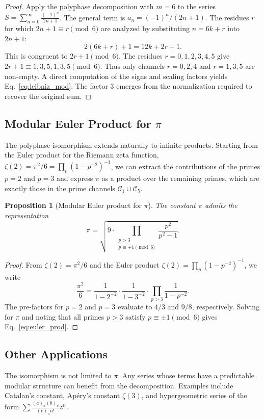 \documentclass{article}
\theoremstyle{plain}
\newtheorem{proposition}[theorem]{Proposition}
\theoremstyle{definition}
\theoremstyle{remark}
\begin{document}
\begin{proof}
Apply the polyphase decomposition with \(m=6\) to the series \(S = \sum_{n=0}^{\infty} \frac{(-1)^n}{2n+1}\). The general term is \(a_n = (-1)^n / (2n+1)\). The residues \(r\) for which \(2n+1 \equiv r \pmod{6}\) are analyzed by substituting \(n = 6k + r\) into \(2n+1\):
\[
2(6k+r)+1 = 12k + 2r + 1.
\]
This is congruent to \(2r+1 \pmod{6}\). The residues \(r=0,1,2,3,4,5\) give \(2r+1 \equiv 1,3,5,1,3,5 \pmod{6}\). Thus only channels \(r=0,2,4\) and \(r=1,3,5\) are non-empty. A direct computation of the signs and scaling factors yields Eq.~\eqref{eq:leibniz_mod}. The factor 3 emerges from the normalization required to recover the original sum.
\end{proof}

\subsection{Modular Euler Product for \texorpdfstring{\(\pi\)}{pi}}
The polyphase isomorphism extends naturally to infinite products. Starting from the Euler product for the Riemann zeta function, \(\zeta(2) = \pi^2/6 = \prod_p (1 - p^{-2})^{-1}\), we can extract the contributions of the primes \(p=2\) and \(p=3\) and express \(\pi\) as a product over the remaining primes, which are exactly those in the prime channels \(\mathcal{C}_1 \cup \mathcal{C}_5\).

\begin{proposition}[Modular Euler product for \(\pi\)]
\label{prop:euler}
The constant \(\pi\) admits the representation
\begin{equation}
\pi = \sqrt{9 \cdot \prod_{\substack{p > 3 \\ p \equiv \pm 1 \pmod{6}}} \frac{p^2}{p^2 - 1}}.
\label{eq:euler_prod}
\end{equation}
\end{proposition}

\begin{proof}
From \(\zeta(2) = \pi^2/6\) and the Euler product \(\zeta(2) = \prod_p (1 - p^{-2})^{-1}\), we write
\[
\frac{\pi^2}{6} = \frac{1}{1 - 2^{-2}} \cdot \frac{1}{1 - 3^{-2}} \cdot \prod_{p > 3} \frac{1}{1 - p^{-2}}.
\]
The pre-factors for \(p=2\) and \(p=3\) evaluate to \(4/3\) and \(9/8\), respectively. Solving for \(\pi\) and noting that all primes \(p>3\) satisfy \(p \equiv \pm 1 \pmod{6}\) gives Eq.~\eqref{eq:euler_prod}.
\end{proof}

\subsection{Other Applications}
The isomorphism is not limited to \(\pi\). Any series whose terms have a predictable modular structure can benefit from the decomposition. Examples include Catalan's constant, Apéry's constant \(\zeta(3)\), and hypergeometric series of the form \(\sum \frac{(a)_n (b)_n}{(c)_n n!} z^n\).
\end{document}
